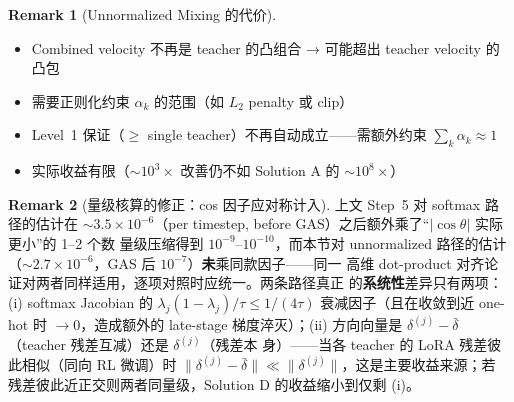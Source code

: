 \documentclass[11pt,a4paper]{article}
\theoremstyle{definition}
\newtheorem{remark}{Remark}
\begin{document}
\begin{remark}[Unnormalized Mixing 的代价]
\begin{itemize}[leftmargin=1em]
\item Combined velocity 不再是 teacher 的凸组合 → 可能超出 teacher velocity 的凸包
\item 需要正则化约束 $\alpha_k$ 的范围（如 $L_2$ penalty 或 clip）
\item Level~1 保证（$\geq$ single teacher）不再自动成立——需额外约束 $\sum_k \alpha_k \approx 1$
\item 实际收益有限（$\sim 10^{3}\times$ 改善仍不如 Solution A 的 $\sim 10^{8}\times$）
\end{itemize}
\end{remark}

\begin{remark}[量级核算的修正：cos 因子应对称计入]
\label{rem:bookkeeping}
上文 Step~5 对 softmax 路径的估计在 $\sim 3.5\times 10^{-6}$（per
timestep, before GAS）之后额外乘了``$|\cos\theta|$ 实际更小''的 1--2 个数
量级压缩得到 $10^{-9}$--$10^{-10}$，而本节对 unnormalized 路径的估计
（$\sim 2.7\times 10^{-6}$，GAS 后 $10^{-7}$）\textbf{未}乘同款因子——同一
高维 dot-product 对齐论证对两者同样适用，逐项对照时应统一。两条路径真正
的\textbf{系统性}差异只有两项：(i) softmax Jacobian 的
$\lambda_j(1-\lambda_j)/\tau \leq 1/(4\tau)$ 衰减因子（且在收敛到近
one-hot 时 $\to 0$，造成额外的 late-stage 梯度淬灭）；(ii) 方向向量是
$\delta^{(j)}-\bar\delta$（teacher 残差互减）还是 $\delta^{(j)}$（残差本
身）——当各 teacher 的 LoRA 残差彼此相似（同向 RL 微调）时
$\|\delta^{(j)}-\bar\delta\| \ll \|\delta^{(j)}\|$，这是主要收益来源；若
残差彼此近正交则两者同量级，Solution D 的收益缩小到仅剩 (i)。
\end{remark}
\end{document}
